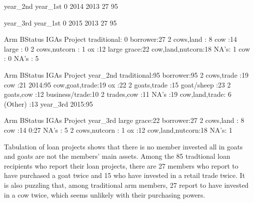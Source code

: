 \begin{Schunk}
\begin{Soutput}
\end{Soutput}
\begin{Soutput}
        year_2nd
year_1st  0 2014
    2013 27   95
\end{Soutput}
\begin{Soutput}
        year_3rd
year_1st  0 2015
    2013 27   95
\end{Soutput}
\begin{Soutput}
          Arm         BStatus                 IGAs    Project  
 traditional: 0   borrower:27   2 cows,land     : 8   cow :14  
 large      : 0                 2 cows,nutcorn  : 1   ox  :12  
 large grace:22                 cow,land,nutcorn:18   NA's: 1  
 cow        : 0                                                
 NA's       : 5                                                
\end{Soutput}
\begin{Soutput}
          Arm         BStatus               IGAs              Project   year_2nd 
 traditional:95   borrower:95   2 cows,trade  :19   cow           :21   2014:95  
                                cow,goat,trade:19   ox            :22            
                                2 goats,trade :15   goat/sheep    :23            
                                2 goats,cow   :12   business/trade:10            
                                2 trades,cow  :11   NA's          :19            
                                cow,land,trade: 6                                
                                (Other)       :13                                
 year_3rd 
 2015:95  
          
          
          
          
          
          
\end{Soutput}
\begin{Soutput}
          Arm         BStatus                 IGAs    Project   year_3rd
 large grace:22   borrower:27   2 cows,land     : 8   cow :14   0:27    
 NA's       : 5                 2 cows,nutcorn  : 1   ox  :12           
                                cow,land,nutcorn:18   NA's: 1           
\end{Soutput}
\end{Schunk}
Tabulation of loan projects shows that there is no member invested all in goats and goats are not the members' main assets. Among the 85 \textsf{tradtional} loan recipients who report their loan projects, there are 27 members who report to have purchased a goat twice and 15 who have invested in a retail trade twice. It is also puzzling that, among \textsf{traditional} arm members, 27 report to have invested in a cow twice, which seems unlikely with their purchasing powers. 
